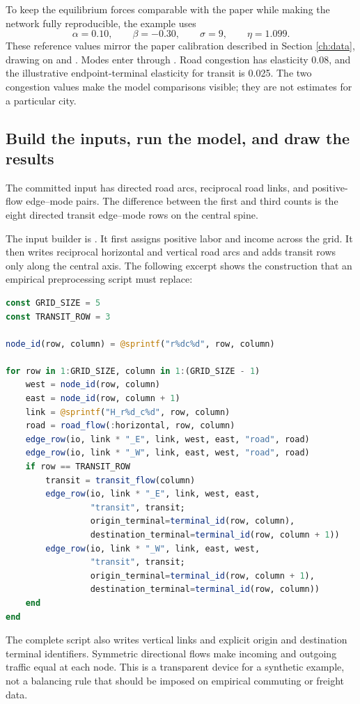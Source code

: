 To keep the equilibrium forces comparable with the paper while making the
network fully reproducible, the example uses
\[
 \alpha=0.10,\qquad \beta=-0.30,\qquad \sigma=9,
 \qquad \eta=1.099.
\]
These reference values mirror the paper calibration described in Section
\ref{ch:data}, drawing on
\citet{AllenArkolakis2014,AllenArkolakis2020} and
\citet{FuchsWong2026Multimodal}.
Modes enter through . Road congestion has elasticity
0.08, and the illustrative endpoint-terminal elasticity for transit is 0.025.
The two congestion values make the model comparisons visible; they are not
estimates for a particular city.

\subsection{Build the inputs, run the model, and draw the results}

The committed input has \GridDirectedRoadArcCount{} directed road arcs,
\GridPhysicalRoadLinkCount{} reciprocal road links, and
\GridActiveEdgeModeCount{} positive-flow edge--mode pairs. The difference
between the first and third counts is the eight directed transit edge--mode
rows on the central spine.

The input builder is
. It first assigns positive
labor and income across the grid. It then writes reciprocal horizontal
and vertical road arcs and adds transit rows only along the central axis. The
following excerpt shows the construction that an empirical preprocessing
script must replace:
\begin{lstlisting}[language=Julia]
const GRID_SIZE = 5
const TRANSIT_ROW = 3

node_id(row, column) = @sprintf("r%dc%d", row, column)

for row in 1:GRID_SIZE, column in 1:(GRID_SIZE - 1)
    west = node_id(row, column)
    east = node_id(row, column + 1)
    link = @sprintf("H_r%d_c%d", row, column)
    road = road_flow(:horizontal, row, column)
    edge_row(io, link * "_E", link, west, east, "road", road)
    edge_row(io, link * "_W", link, east, west, "road", road)
    if row == TRANSIT_ROW
        transit = transit_flow(column)
        edge_row(io, link * "_E", link, west, east,
                 "transit", transit;
                 origin_terminal=terminal_id(row, column),
                 destination_terminal=terminal_id(row, column + 1))
        edge_row(io, link * "_W", link, east, west,
                 "transit", transit;
                 origin_terminal=terminal_id(row, column + 1),
                 destination_terminal=terminal_id(row, column))
    end
end
\end{lstlisting}
The complete script also writes vertical links and explicit origin and
destination terminal identifiers. Symmetric directional flows make incoming
and outgoing traffic equal at each node. This is a transparent device for a
synthetic example, not a balancing rule that should be imposed on empirical
commuting or freight data.

